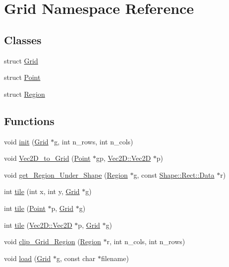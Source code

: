 \hypertarget{namespace_grid}{}\section{Grid Namespace Reference}
\label{namespace_grid}
\subsection*{Classes}
\begin{DoxyCompactItemize}
\item 
struct \mbox{\hyperlink{struct_grid_1_1_grid}{Grid}}
\item 
struct \mbox{\hyperlink{struct_grid_1_1_point}{Point}}
\item 
struct \mbox{\hyperlink{struct_grid_1_1_region}{Region}}
\end{DoxyCompactItemize}
\subsection*{Functions}
\begin{DoxyCompactItemize}
\item 
void \mbox{\hyperlink{namespace_grid_a381a9dd7e313111348df0dd65b5e6b4c}{init}} (\mbox{\hyperlink{struct_grid_1_1_grid}{Grid}} $\ast$g, int n\+\_\+rows, int n\+\_\+cols)
\item 
void \mbox{\hyperlink{namespace_grid_a07bf38e1a6daf3be9ad0d8b1527fcab2}{Vec2\+D\+\_\+to\+\_\+\+Grid}} (\mbox{\hyperlink{struct_grid_1_1_point}{Point}} $\ast$gp, \mbox{\hyperlink{struct_vec2_d_1_1_vec2_d}{Vec2\+D\+::\+Vec2D}} $\ast$p)
\item 
void \mbox{\hyperlink{namespace_grid_ab92654ff6a03a22f84957055fbde567c}{get\+\_\+\+Region\+\_\+\+Under\+\_\+\+Shape}} (\mbox{\hyperlink{struct_grid_1_1_region}{Region}} $\ast$g, const \mbox{\hyperlink{struct_shape_1_1_rect_1_1_data}{Shape\+::\+Rect\+::\+Data}} $\ast$r)
\item 
int \mbox{\hyperlink{namespace_grid_ac334e1bf10e373e75d6bb9777d400712}{tile}} (int x, int y, \mbox{\hyperlink{struct_grid_1_1_grid}{Grid}} $\ast$g)
\item 
int \mbox{\hyperlink{namespace_grid_ac13cc066a37157453105c616d466a6d5}{tile}} (\mbox{\hyperlink{struct_grid_1_1_point}{Point}} $\ast$p, \mbox{\hyperlink{struct_grid_1_1_grid}{Grid}} $\ast$g)
\item 
int \mbox{\hyperlink{namespace_grid_a90730af11e3c4c1272d81ce712c29625}{tile}} (\mbox{\hyperlink{struct_vec2_d_1_1_vec2_d}{Vec2\+D\+::\+Vec2D}} $\ast$p, \mbox{\hyperlink{struct_grid_1_1_grid}{Grid}} $\ast$g)
\item 
void \mbox{\hyperlink{namespace_grid_a964327026e6d0cdadf17407401d96df7}{clip\+\_\+\+Grid\+\_\+\+Region}} (\mbox{\hyperlink{struct_grid_1_1_region}{Region}} $\ast$r, int n\+\_\+cols, int n\+\_\+rows)
\item 
void \mbox{\hyperlink{namespace_grid_a3c9db382b0e0989888ec78831164c4be}{load}} (\mbox{\hyperlink{struct_grid_1_1_grid}{Grid}} $\ast$g, const char $\ast$filename)
\end{DoxyCompactItemize}


